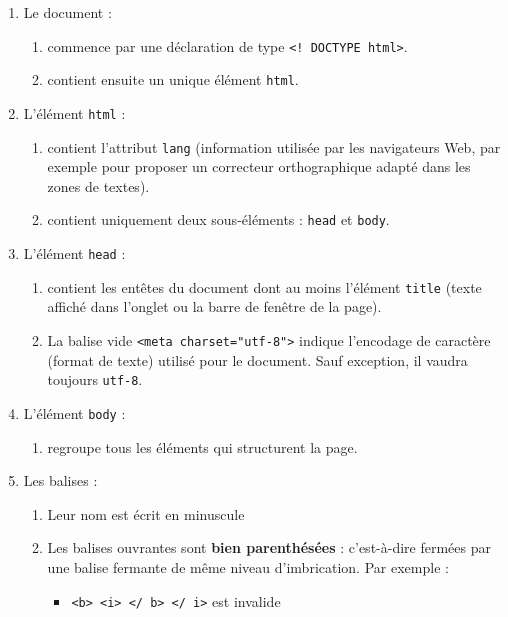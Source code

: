 \documentclass[a4paper,12pt]{article}
\providecommand{\tightlist}{%
      \setlength{\itemsep}{0pt}\setlength{\parskip}{0pt}}
\begin{document}
\begin{enumerate}
\def\labelenumi{\arabic{enumi}.}
\tightlist
\item
  Le document :

  \begin{enumerate}
  \def\labelenumii{\arabic{enumii}.}
  \tightlist
  \item
    commence par une déclaration de type
    \texttt{\textless{}!\ DOCTYPE\ html\textgreater{}}.
  \item
    contient ensuite un unique élément \texttt{html}.
  \end{enumerate}
\item
  L'élément \texttt{html} :

  \begin{enumerate}
  \def\labelenumii{\arabic{enumii}.}
  \tightlist
  \item
    contient l'attribut \texttt{lang} (information utilisée par les
    navigateurs Web, par exemple pour proposer un correcteur
    orthographique adapté dans les zones de textes).
  \item
    contient uniquement deux sous-éléments : \texttt{head} et
    \texttt{body}.
  \end{enumerate}
\item
  L'élément \texttt{head} :

  \begin{enumerate}
  \def\labelenumii{\arabic{enumii}.}
  \tightlist
  \item
    contient les entêtes du document dont au moins l'élément
    \texttt{title} (texte affiché dans l'onglet ou la barre de fenêtre
    de la page).
  \item
    La balise vide
    \texttt{\textless{}meta\ charset="utf-8"\textgreater{}} indique
    l'encodage de caractère (format de texte) utilisé pour le document.
    Sauf exception, il vaudra toujours \texttt{utf-8}.
  \end{enumerate}
\item
  L'élément \texttt{body} :

  \begin{enumerate}
  \def\labelenumii{\arabic{enumii}.}
  \tightlist
  \item
    regroupe tous les éléments qui structurent la page.
  \end{enumerate}
\item
  Les balises :

  \begin{enumerate}
  \def\labelenumii{\arabic{enumii}.}
  \tightlist
  \item
    Leur nom est écrit en minuscule
  \item
    Les balises ouvrantes sont \textbf{bien parenthésées} : c'est-à-dire
    fermées par une balise fermante de même niveau d'imbrication. Par
    exemple :

    \begin{itemize}
    \tightlist
    \item
      \texttt{\textless{}b\textgreater{}\ \textless{}i\textgreater{}\ \textless{}/\ b\textgreater{}\ \textless{}/\ i\textgreater{}}
      est invalide
    \end{itemize}
  \end{enumerate}
\end{enumerate}
\end{document}
